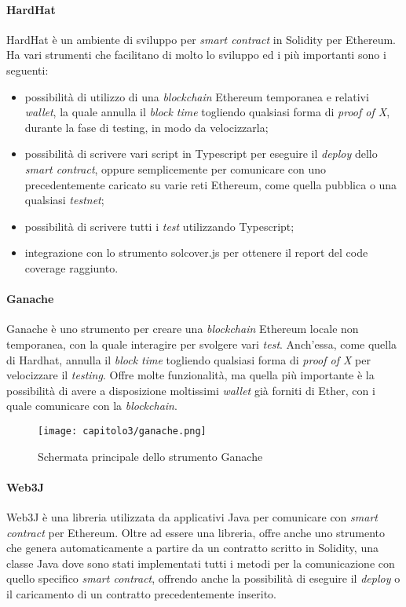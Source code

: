 \paragraph{HardHat}
HardHat è un ambiente di sviluppo per \textit{smart contract} in Solidity per Ethereum. Ha vari strumenti che facilitano di molto lo sviluppo ed i più importanti sono i seguenti:
\begin{itemize}
  \item possibilità di utilizzo di una \textit{blockchain} Ethereum temporanea e relativi \textit{wallet}, la quale annulla il \textit{block time} togliendo qualsiasi forma di \textit{proof of X}, durante la fase di testing, in modo da velocizzarla;
  \item possibilità di scrivere vari script in Typescript per eseguire il \textit{deploy} dello \textit{smart contract}, oppure semplicemente per comunicare con uno precedentemente caricato su varie reti Ethereum, come quella pubblica o una qualsiasi \textit{testnet};
  \item possibilità di scrivere tutti i \textit{test} utilizzando Typescript;
  \item integrazione con lo strumento solcover.js per ottenere il report del code coverage raggiunto.
\end{itemize}

\paragraph{Ganache}
Ganache è uno strumento per creare una \textit{blockchain} Ethereum locale non temporanea, con la quale interagire per svolgere vari \textit{test}. Anch'essa, come quella di Hardhat, annulla il \textit{block time} togliendo qualsiasi forma di \textit{proof of X} per velocizzare il \textit{testing}. Offre molte funzionalità, ma quella più importante è la possibilità di avere a disposizione moltissimi \textit{wallet} già forniti di Ether, con i quale comunicare con la \textit{blockchain}.

\clearpage
\begin{figure}[h!]
  \centering
  \texttt{[image: capitolo3/ganache.png]}
  \caption{Schermata principale dello strumento Ganache}
\end{figure}

\paragraph{Web3J} 
Web3J è una libreria utilizzata da applicativi Java per comunicare con \textit{smart contract} per Ethereum.
Oltre ad essere una libreria, offre anche uno strumento che genera automaticamente a partire da un contratto scritto in Solidity, una classe Java dove sono stati implementati tutti i metodi per la comunicazione con quello specifico \textit{smart contract}, offrendo anche la possibilità di eseguire il \textit{deploy} o il caricamento di un contratto precedentemente inserito. 

